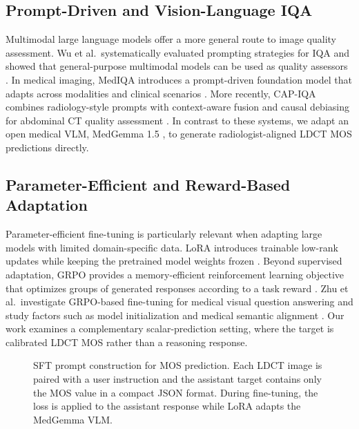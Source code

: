 \documentclass[10pt,twocolumn,letterpaper]{article}
\begin{document}
\subsection{Prompt-Driven and Vision-Language IQA}
Multimodal large language models offer a more general route to image quality assessment. Wu et al.\ systematically evaluated prompting strategies for IQA and showed that general-purpose multimodal models can be used as quality assessors \cite{wu2024comprehensive}. In medical imaging, MedIQA introduces a prompt-driven foundation model that adapts across modalities and clinical scenarios \cite{xun2025mediqa}. More recently, CAP-IQA combines radiology-style prompts with context-aware fusion and causal debiasing for abdominal CT quality assessment \cite{rifa2026capiqa}. In contrast to these systems, we adapt an open medical VLM, MedGemma 1.5 \cite{sellergren2026medgemma}, to generate radiologist-aligned LDCT MOS predictions directly.

\subsection{Parameter-Efficient and Reward-Based Adaptation}
Parameter-efficient fine-tuning is particularly relevant when adapting large models with limited domain-specific data. LoRA introduces trainable low-rank updates while keeping the pretrained model weights frozen \cite{hu2022lora}. Beyond supervised adaptation, GRPO provides a memory-efficient reinforcement learning objective that optimizes groups of generated responses according to a task reward \cite{shao2024deepseekmath}. Zhu et al.\ investigate GRPO-based fine-tuning for medical visual question answering and study factors such as model initialization and medical semantic alignment \cite{zhu2025medicalgrpo}. Our work examines a complementary scalar-prediction setting, where the target is calibrated LDCT MOS rather than a reasoning response.

\begin{figure}[t]
  \centering
  \resizebox{0.88\textwidth}{!}{}
  \caption{SFT prompt construction for MOS prediction. Each LDCT image is paired with a user instruction and the assistant target contains only the MOS value in a compact JSON format. During fine-tuning, the loss is applied to the assistant response while LoRA adapts the MedGemma VLM.}
  \label{fig:sft-prompt-flow}
\end{figure}
\end{document}
